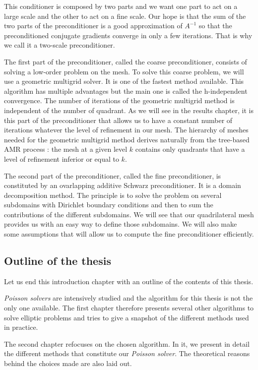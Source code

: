 This conditioner is composed by two parts and we want one part to act on a large scale and the other to act on a fine scale. Our hope is that the sum of the two parts of the preconditioner is a good approximation of $A^{-1}$ so that the preconditioned conjugate gradients converge in only a few iterations. That is why we call it a two-scale preconditioner.    

The first part of the preconditioner, called the coarse preconditioner, consists of solving a low-order problem on the mesh. To solve this coarse problem, we will use a geometric multigrid solver. It is one of the fastest method available. This algorithm has multiple advantages but the main one is called the h-independent convergence. The number of iterations of the geometric multigrid method is independent of the number of quadrant. As we will see in the results chapter, it is this part of the preconditioner that allows us to have a constant number of iterations whatever the level of refinement in our mesh. The hierarchy of meshes needed for the geometric multigrid method derives naturally from the tree-based AMR process : the mesh at a given level $k$ contains only quadrants that have a level of refinement inferior or equal to $k$.   

The second part of the preconditioner, called the fine preconditioner, is constituted by an ovarlapping additive Schwarz preconditioner. It is a domain decomposition method. The principle is to solve the problem on several subdomains with Dirichlet boundary conditions and then to sum the contributions of the different subdomains. We will see that our quadrilateral mesh provides us with an easy way to define those subdomains. We will also make some assumptions that will allow us to compute the fine preconditioner efficiently.   

\subsection*{Outline of the thesis}

Let us end this introduction chapter with an outline of the contents of this thesis. 

\textit{Poisson solvers} are intensively studied and the algorithm for this thesis is not the only one available. The first chapter therefore presents several other algorithms to solve elliptic problems and tries to give a snapshot of the different methods used in practice. 

The second chapter refocuses on the chosen algorithm. In it, we present in detail the different methods that constitute our \textit{Poisson solver}. The theoretical reasons behind the choices made are also laid out.


